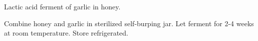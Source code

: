 \documentclass[main]{subfiles}
\begin{document}
Lactic acid ferment of garlic in honey.

\begin{rec}
Combine honey and garlic in sterilized self-burping jar.
Let ferment for 2-4 weeks at room temperature.
\newstep
Store refrigerated.
\end{rec}
\end{document}
